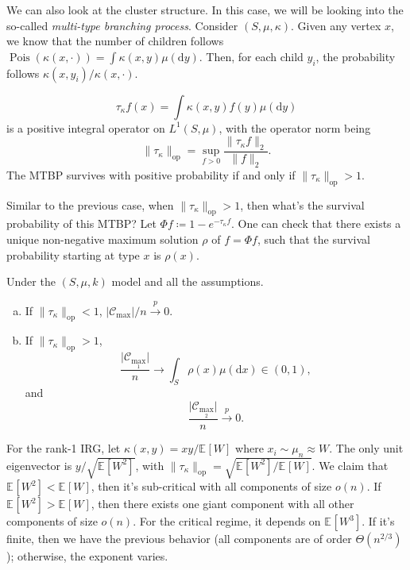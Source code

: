 We can also look at the cluster structure. In this case, we will be looking into the so-called \emph{multi-type branching process}. Consider \((S, \mu , \kappa )\). Given any vertex \(x\), we know that the number of children follows \(\operatorname{Pois}(\kappa (x, \cdot)) = \int \kappa (x, y) \mu (\mathrm{d} y)\). Then, for each child \(y_i\), the probability follows \(\kappa (x, y_i) / \kappa (x, \cdot)\).

\begin{intuition}
	\[
		\tau _\kappa f(x)
		= \int \kappa (x, y) f(y) \mu (\mathrm{d} y)
	\]
	is a positive integral operator on \(L^1(S, \mu )\), with the operator norm being
	\[
		\lVert \tau _{\kappa } \rVert _{\mathrm{op} }
		= \sup _{f > 0} \frac{\lVert \tau _\kappa f \rVert _2}{\lVert f \rVert _2}.
	\]
	The MTBP survives with positive probability if and only if \(\lVert \tau _{\kappa } \rVert _{\mathrm{op} } > 1\).

	Similar to the previous case, when \(\lVert \tau _{\kappa } \rVert _{\mathrm{op} } > 1\), then what's the survival probability of this MTBP? Let \(\Phi f \coloneqq 1 - e^{- \tau _{\kappa } f}\). One can check that there exists a unique non-negative maximum solution \(\rho \) of \(f = \Phi f\), such that the survival probability starting at type \(x\) is \(\rho (x)\).

	\begin{theorem}
		Under the \((S, \mu , k)\) model and all the assumptions.
		\begin{enumerate}[(a)]
			\item If \(\lVert \tau _{\kappa } \rVert _{\mathrm{op} } < 1\), \(\lvert \mathcal{C} _{\max } \rvert / n \overset{p}{\to} 0\).
			\item If \(\lVert \tau _{\kappa } \rVert _{\mathrm{op} } > 1\),
			      \[
				      \frac{\lvert \mathcal{C} _{\max _1} \rvert }{n}
				      \to \int _S \rho (x) \mu (\mathrm{d} x) \in (0, 1),
			      \]
			      and
			      \[
				      \frac{\lvert \mathcal{C} _{\max _2} \rvert }{n} \overset{p}{\to} 0.
			      \]
		\end{enumerate}
	\end{theorem}
\end{intuition}

\begin{eg}
	For the rank-1 IRG, let \(\kappa (x, y) = xy / \mathbb{E}_{}[W] \) where \(x_i \sim \mu _n \approx W\). The only unit eigenvector is \(y / \sqrt{\mathbb{E}_{}[W^2] } \), with \(\lVert \tau _{\kappa } \rVert _{\mathrm{op} }= \sqrt{\mathbb{E}_{}[W^2] / \mathbb{E}_{}[W] } \). We claim that \(\mathbb{E}_{}[W^2] < \mathbb{E}_{}[W] \), then it's sub-critical with all components of size \(o(n)\). If \(\mathbb{E}_{}[W^2] > \mathbb{E}_{}[W] \), then there exists one giant component with all other components of size \(o(n)\). For the critical regime, it depends on \(\mathbb{E}_{}[W^3] \). If it's finite, then we have the previous behavior (all components are of order \(\Theta (n^{2 / 3})\)); otherwise, the exponent varies.
\end{eg}


